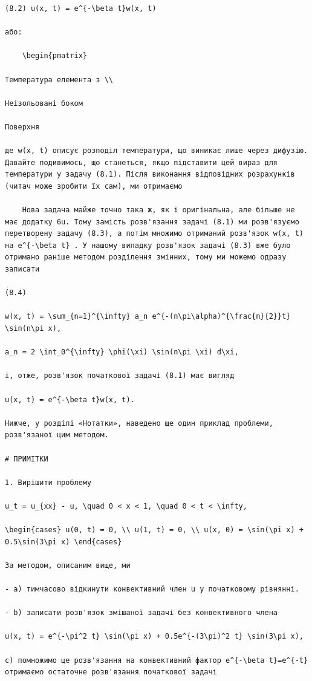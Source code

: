 \documentclass[
  ukrainian,
]{article}
\begin{document}
\begin{verbatim}
(8.2) u(x, t) = e^{-\beta t}w(x, t)

або:

    \begin{pmatrix}

Температура елемента з \\

Неізольовані боком

Поверхня

де w(x, t) описує розподіл температури, що виникає лише через дифузію. Давайте подивимось, що станеться, якщо підставити цей вираз для температури у задачу (8.1). Після виконання відповідних розрахунків (читач може зробити їх сам), ми отримаємо

    Нова задача майже точно така ж, як і оригінальна, але більше не має додатку 6u. Тому замість розв'язання задачі (8.1) ми розв'язуємо перетворену задачу (8.3), а потім множимо отриманий розв'язок w(x, t) на e^{-\beta t} . У нашому випадку розв'язок задачі (8.3) вже було отримано раніше методом розділення змінних, тому ми можемо одразу записати

(8.4)

w(x, t) = \sum_{n=1}^{\infty} a_n e^{-(n\pi\alpha)^{\frac{n}{2}}t} \sin(n\pi x),

a_n = 2 \int_0^{\infty} \phi(\xi) \sin(n\pi \xi) d\xi,

і, отже, розв'язок початкової задачі (8.1) має вигляд

u(x, t) = e^{-\beta t}w(x, t).

Нижче, у розділі «Нотатки», наведено ще один приклад проблеми, розв'язаної цим методом.

# ПРИМІТКИ

1. Вирішити проблему

u_t = u_{xx} - u, \quad 0 < x < 1, \quad 0 < t < \infty,

\begin{cases} u(0, t) = 0, \\ u(1, t) = 0, \\ u(x, 0) = \sin(\pi x) + 0.5\sin(3\pi x) \end{cases}

За методом, описаним вище, ми

- a) тимчасово відкинути конвективний член u у початковому рівнянні.

- b) записати розв'язок змішаної задачі без конвективного члена

u(x, t) = e^{-\pi^2 t} \sin(\pi x) + 0.5e^{-(3\pi)^2 t} \sin(3\pi x),

c) помножимо це розв'язання на конвективний фактор e^{-\beta t}=e^{-t}отримаємо остаточне розв'язання початкової задачі


\end{verbatim}
\end{document}
